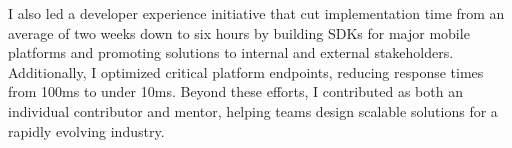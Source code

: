 \documentclass[10pt]{article}
\newcommand{\DescribedEntryTitle}[3] {
  \noindent \textit{\strong{#1}, #2} \hfill \textit{#3}
  \\
}
\begin{document}
\begin{flushleft}
{  I also led a developer experience initiative that cut implementation time
  from an average of two weeks down to six hours by building SDKs for major
  mobile platforms and promoting solutions to internal and external
  stakeholders. Additionally, I optimized critical platform endpoints, reducing
  response times from 100ms to under 10ms. Beyond these efforts, I contributed
  as both an individual contributor and mentor, helping teams design scalable
  solutions for a rapidly evolving industry.
}
\vspace{.1in}

\iftoggle{MODELONG}{
  \DescribedEntryTitle{Software Engineer, Freelance}{Minond, LLC}{May 2017 - April 2018}{
    Helped companies dismantle and analyze problems, develop and vet new ideas
    and solutions, and build mission-critical products.
  }
}{
  \DescribedEntryTitle{Software Engineer, Freelance}{Minond, LLC}{May 2017 - April 2018}
}
\vspace{.1in}


\end{flushleft}
\end{document}
